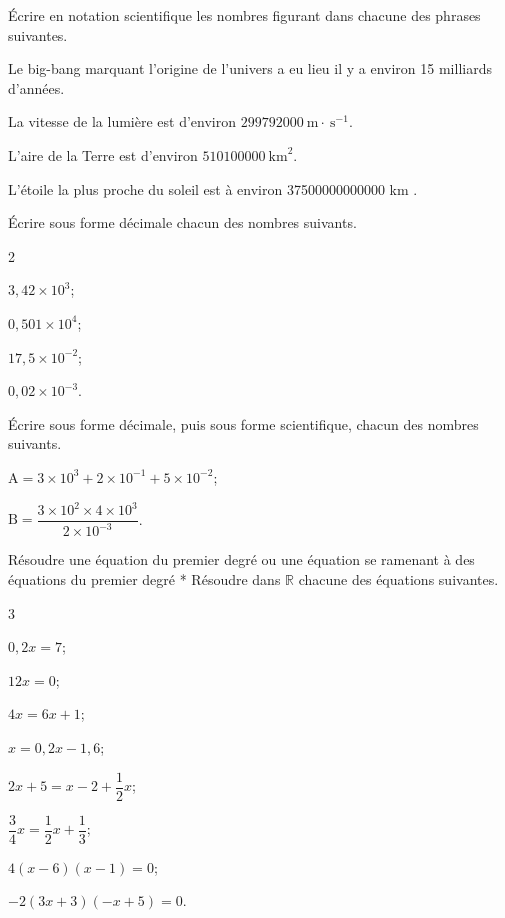 \documentclass[a4paper,10pt]{book}        %
\begin{document}

Écrire en notation scientifique les nombres figurant dans chacune des phrases suivantes.
\begin{enumMet}
	\item Le big-bang marquant l'origine de l'univers a eu lieu il y a environ 15 milliards d'années.
	\item La vitesse de la lumière est d'environ $299792000 \mathrm{~m} \cdot \mathrm{~s}^{-1}$.
	\item L'aire de la Terre est d'environ $510100000 \mathrm{~km}^{2}$.
	\item L'étoile la plus proche du soleil est à environ 37500000000000 km .
\end{enumMet}
Écrire sous forme décimale chacun des nombres suivants.
\begin{multicols}{2}
	\begin{enumMet}
	\item $3,42 \times 10^{3}$;
	\item $0,501 \times 10^{4}$;
	\item $17,5 \times 10^{-2}$;
	\item $0,02 \times 10^{-3}$.
\end{enumMet}
\end{multicols}

Écrire sous forme décimale, puis sous forme scientifique, chacun des nombres suivants.
\begin{enumMet}
	\item $\mathrm{A}=3 \times 10^{3}+2 \times 10^{-1}+5 \times 10^{-2}$;
	\item $\mathrm{B}=\dfrac{3 \times 10^{2} \times 4 \times 10^{3}}{2 \times 10^{-3}}$.
\end{enumMet}


Résoudre une équation du premier degré ou une équation se ramenant à des équations du premier degré * Résoudre dans $\mathbb{R}$ chacune des équations suivantes.
\begin{multicols}{3}
	\begin{enumMet}
	\item $0,2 x=7$;
	\item $12 x=0$;
	\item $4 x=6 x+1$;
	\item $x=0,2 x-1,6$;
	\item $2 x+5=x-2+\dfrac{1}{2} x$;
	\item $\dfrac{3}{4} x=\dfrac{1}{2} x+\dfrac{1}{3}$;
	\item $4(x-6)(x-1)=0$;
	\item $-2(3 x+3)(-x+5)=0$.
\end{enumMet}
\end{multicols}
\end{document}
